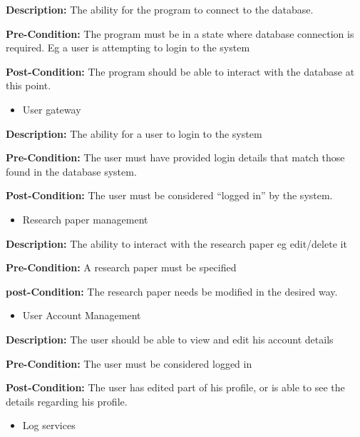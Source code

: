 \documentclass[11pt]{article}
\begin{document}
{\raggedright
	\textbf{Description: }The ability for the program to connect to the database.
}

{\raggedright
	\textbf{Pre-Condition: }The program must be in a state where database connection
	is required. Eg a user is attempting to login to the system
}

{\raggedright
	\textbf{Post-Condition: }The program should be able to interact with the
	database at this point.
}

\begin{itemize}
	\item User gateway
\end{itemize}

{\raggedright
	\textbf{Description: }The ability for a user to login to the system
}

{\raggedright
	\textbf{Pre-Condition: }The user must have provided login details that match
	those found in the database system.
}

{\raggedright
	\textbf{Post-Condition: }The user must be considered “logged in” by the system.
}

\begin{itemize}
	\item Research paper management
\end{itemize}

{\raggedright
	\textbf{Description: }The ability to interact with the research paper eg
	edit/delete it
}

{\raggedright
	\textbf{Pre-Condition: }A research paper must be specified
}

{\raggedright
	\textbf{post-Condition: }The research paper needs be modified in the desired
	way.
}

\begin{itemize}
	\item User Account Management
\end{itemize}

{\raggedright
	\textbf{Description: }The user should be able to view and edit his account details
}

{\raggedright
	\textbf{Pre-Condition: }The user must be considered logged in
}

{\raggedright
	\textbf{Post-Condition: }The user has edited part of his profile, or is able to see the details regarding his profile.
}

\begin{itemize}
	\item Log services
\end{itemize}
\end{document}
